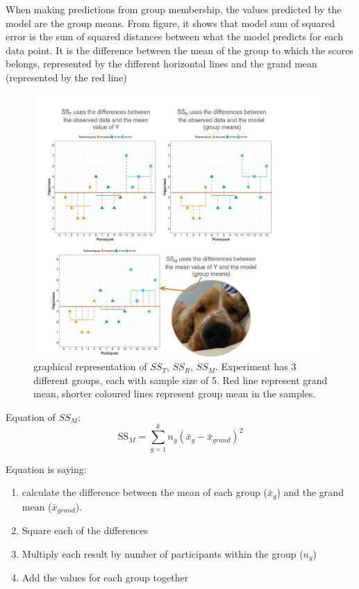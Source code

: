 When making predictions from group membership, the values predicted by the model are the group means. From figure, it shows that model sum of squared error is the sum of squared distances between what the model predicts for each data point.  It is the difference between the mean of the group to which the scores belongs, represented by the different horizontal lines and the grand mean (represented by the red line)
\begin{figure}[h]
	\includegraphics[width=1\textwidth,height=100mm]{Chapter 12 GLM 1 Comparing Several Independent Means ANOVA/sumofsquarederror.PNG}
	\caption{graphical representation of $SS_T$, $SS_R$,  $SS_M$. Experiment has 3 different groups, each with sample size of 5. Red line represent grand mean, shorter coloured lines represent group mean in the samples.}
\end{figure}

Equation of \textbf{$SS_M$}:
\begin{equation}
\text{SS}_M = \sum^k_{g=1} n_g(\bar{x}_g - \bar{x}_{grand})^2
\end{equation}

Equation is saying:
\begin{enumerate}
\item calculate the difference between the mean of each group ($\bar{x}_g$) and the grand mean ($\bar{x}_{grand}$).
\item Square each of the differences
\item Multiply each result by number of participants within the group ($n_g$)
\item Add the values for each group together
\end{enumerate}

